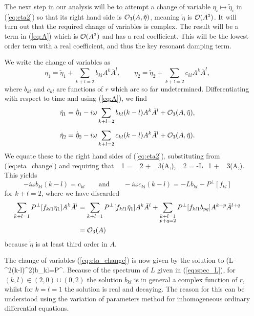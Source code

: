 The next step in our analysis will be to attempt a change of variable $\eta_i\mapsto\tilde{\eta}_i$ in (\ref{eq:eta2}) so that its right hand side is $\mathcal{O}_3(A,\tilde{\eta})$, meaning $\tilde{\eta}$ is $\mathcal{O}(A^3)$. It will turn out that the required change of variables is complex. The result will be a term in (\ref{eq:A}) which is $\mathcal{O}(A^3)$ and has a real coefficient. This will be the lowest order term with a real coefficient, and thus the key resonant damping term. %

We write the change of variables as
\begin{equation} \label{eq:eta_change}
\eta_1 = \tilde{\eta}_1 + \sum_{k+l=2}b_{kl}A^k\bar{A}^l, \qquad \eta_2 = \tilde{\eta}_2 + \sum_{k+l=2}c_{kl}A^k\bar{A}^l,
\end{equation}
where $b_{kl}$ and $c_{kl}$ are functions of $r$ which are so far undetermined. Differentiating with respect to time and using (\ref{eq:A}), we find
\begin{align*}
\dot{\eta}_1 &= \dot{\tilde{\eta}}_1 - i\omega\sum_{k+l=2}b_{kl}(k-l)A^k\bar{A}^l+\mathcal{O}_3(A,\tilde{\eta}), \\[5pt]
 \dot{\eta}_2 &= \dot{\tilde{\eta}}_2 - i\omega\sum_{k+l=2}c_{kl}(k-l)A^k\bar{A}^l + \mathcal{O}_3(A,\tilde{\eta}).
\end{align*}
We equate these to the right hand sides of (\ref{eq:eta2}), substituting from (\ref{eq:eta_change}) and requiring that
\be \label{eq:eta_tilde}
\dot{\tilde{\eta}}_1 = \tilde{\eta}_2 + \cO_3(A,\tilde{\eta}), \qquad \dot{\tilde{\eta}}_2 = -L\tilde{\eta}_1 + \cO_3(A,\tilde{\eta}).
\ee
This yields
\[
-i\omega b_{kl}(k-l)=c_{kl} \qquad\mbox{and}\qquad -i\omega c_{kl}(k-l)=-Lb_{kl} + P^\perp[f_{kl}]
\]
for $k+l=2$, where we have discarded
\begin{align*}
\sum_{k+l=1} P^\perp[f_{kl1}\eta_1]A^k\bar{A}^l &= \sum_{k+l=1} P^\perp [f_{kl1}\tilde{\eta}_1]A^k\bar{A}^l + \sum_{\substack{k+l=1 \\ p+q=2}} P^\perp [f_{kl1}b_{pq}]A^{k+p}\bar{A}^{l+q} \\
&= \mathcal{O}_3(A)
\end{align*}
because $\tilde{\eta}$ is at least third order in $A$.

The change of variables (\ref{eq:eta_change}) is now given by the solution to
\be \label{eq:solve_for_b}
\big(L-\omega^2(k-l)^2\big)b_{kl}=P^\perp[f_{kl}].
\ee
Because of the spectrum of $L$ given in (\ref{eq:spec_L}), for $(k,l)\in(2,0)\cup (0,2)$ the solution $b_{kl}$ is in general a complex function of $r$, whilst for $k=l=1$ the solution is real and decaying. The reason for this can be understood using the variation of parameters method for inhomogeneous ordinary differential equations.

